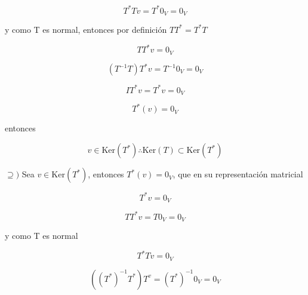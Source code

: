 \documentclass[12pt,a4paper]{article}
\begin{document}
\begin{enumerate}
\begin{enumerate}
        \begin{equation*}
            T^{*}T v = T^{*}0_V = 0_V
        \end{equation*}
        
        y como T es normal, entonces por definición $TT^{*}= T^{*}T$
        
        \begin{equation*}
            TT^{*} v = 0_V
        \end{equation*}
        
        \begin{equation*}
            (T^{-1}T)T^{*}v = T^{-1} 0_V = 0_V
        \end{equation*}
        
        \begin{equation*}
            IT^{*}v = T^{*}v = 0_V
        \end{equation*}
        
        \begin{equation*}
            T^{*}(v)= 0_V
        \end{equation*}
        
        entonces
        
        \begin{equation*}
            v \in \text{Ker}(T^{*}) \therefore \text{Ker}(T) \subset \text{Ker}(T^{*})
        \end{equation*}
        
$\supseteq)$ Sea $v \in \text{Ker}(T^{*})$, entonces $T^{*}(v)= 0_V$, que en su representación matricial

        \begin{equation*}
            T^{*}v = 0_V
        \end{equation*}
        
        \begin{equation*}
            TT^{*} v = T0_V = 0_V
        \end{equation*}
        
        y como T es normal
        
        \begin{equation*}
            T^{*}T v = 0_V
        \end{equation*}
        
        \begin{equation*}
            ((T^{*})^{-1}T^{*})T^v = (T^{*})^{-1} 0_V = 0_V
        \end{equation*}
        

\end{enumerate}
\end{enumerate}
\end{document}
